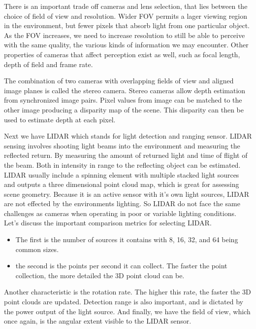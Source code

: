 There is an important trade off cameras and lens selection, that lies between the choice of
field of view and resolution. Wider FOV permits a lager
viewing region in the environment, but fewer pixels that absorb light from one particular object. As the FOV increases, we need to increase resolution to still be
able to perceive with the same quality, the various kinds of information we may encounter. 
Other properties of cameras that affect perception exist as well, such as focal length, depth of field and frame rate. 
 
The combination of two cameras with overlapping fields of view and aligned image planes is
called the stereo camera. Stereo cameras allow depth estimation
from synchronized image pairs. Pixel values from image can be
matched to the other image producing a disparity map of the scene. This disparity can then be used
to estimate depth at each pixel. 


Next we have LIDAR which stands for light detection and ranging sensor. LIDAR sensing involves shooting
light beams into the environment and measuring the reflected return. By measuring the amount of returned
light and time of flight of the beam. Both in intensity in range to
the reflecting object can be estimated. LIDAR usually include a spinning element
with multiple stacked light sources and outputs a three dimensional
point cloud map, which is great for assessing scene geometry. Because it is an active sensor
with it's own light sources, LIDAR are not effected by
the environments lighting. So LIDAR do not face the same challenges
as cameras when operating in poor or variable lighting conditions. Let's discuss the important comparison
metrics for selecting LIDAR.

\begin{itemize}

\item The first is the number of sources it contains with 8, 16, 32, and 64 being common sizes. 
\item the second is the points per second it can collect. The faster the point collection, the more
detailed the 3D point cloud can be. 
\end{itemize}

Another characteristic is the rotation rate. The higher this rate, the faster
the 3D point clouds are updated. Detection range is also important, and is dictated by the power
output of the light source. And finally, we have the field of view,
which once again, is the angular extent
visible to the LIDAR sensor. 

